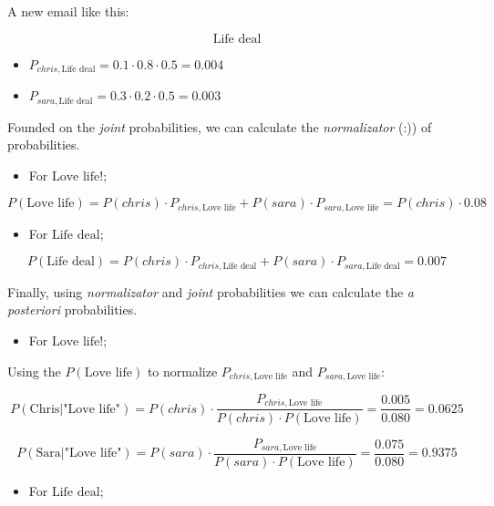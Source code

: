 \documentclass[]{book}
\providecommand{\tightlist}{%
  \setlength{\itemsep}{0pt}\setlength{\parskip}{0pt}}
\begin{document}
A new email like this:

\[\text{Life deal} \tag{2}\]

\begin{itemize}
\tightlist
\item
  \(P_{chris,\text{Life deal}} = 0.1 \cdot 0.8 \cdot 0.5 = 0.004\)
\item
  \(P_{sara,\text{Life deal}} = 0.3 \cdot 0.2 \cdot 0.5 = 0.003\)
\end{itemize}

Founded on the \emph{joint} probabilities, we can calculate the
\emph{normalizator} (:)) of probabilities.

\begin{itemize}
\tightlist
\item
  For \(\text{Love life!}\);
\end{itemize}

\[P(\text{Love life}) = P(chris) \cdot P_{chris,\text{Love life}} + P(sara) \cdot P_{sara,\text{Love life}} = P(chris) \cdot 0.08\]

\begin{itemize}
\tightlist
\item
  For \(\text{Life deal}\);
\end{itemize}

\[P(\text{Life deal}) = P(chris) \cdot P_{chris,\text{Life deal}} + P(sara) \cdot P_{sara,\text{Life deal}} = 0.007\]

Finally, using \emph{normalizator} and \emph{joint} probabilities we can
calculate the \emph{a posteriori} probabilities.

\begin{itemize}
\tightlist
\item
  For \(\text{Love life!}\);
\end{itemize}

Using the \(P(\text{Love life})\) to normalize
\(P_{chris,\text{Love life}}\) and \(P_{sara,\text{Love life}}\):

\[P(\text{Chris|"Love life"}) = P(chris) \cdot \frac{P_{chris,\text{Love life}}}{P(chris) \cdot P(\text{Love life})} = \frac{0.005}{0.080} = 0.0625\]

\[P(\text{Sara|"Love life"}) = P(sara) \cdot \frac{P_{sara,\text{Love life}}}{P(sara) \cdot P(\text{Love life})} = \frac{0.075}{0.080} = 0.9375\]

\begin{itemize}
\tightlist
\item
  For \(\text{Life deal}\);
\end{itemize}
\end{document}
